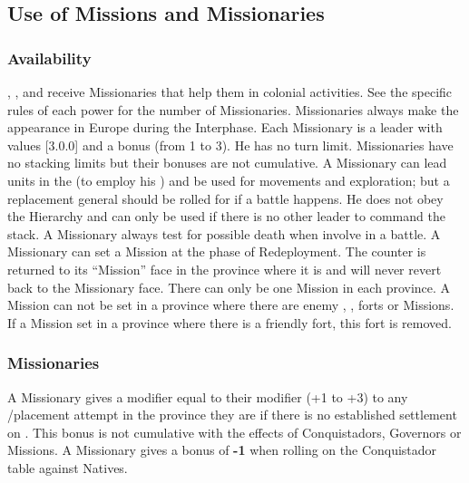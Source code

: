


\subsection{Use of Missions and Missionaries}


\subsubsection{Availability}
\aparag \SPA, \POR, \FRA and \ANG receive Missionaries that help them in
colonial activities. See the specific rules of each power for the number of
Missionaries.
\bparag Missionaries always make the appearance in Europe during the
Interphase.
\aparag Each Missionary is a leader with values [3.0.0] and a bonus (from 1 to
3). He has no turn limit. Missionaries have no stacking limits but their
bonuses are not cumulative.
\bparag A Missionary can lead units in the \ROTW (to employ his \Man) and be
used for movements and exploration; but a replacement general should be rolled
for if a battle happens. He does not obey the Hierarchy and can only be used
if there is no other leader to command the stack. A Missionary always test for
possible death when involve in a battle.
\aparag A Missionary can set a Mission at the phase of Redeployment. The
counter is returned to its ``Mission'' face in the province where it is and
will never revert back to the Missionary face.
\bparag There can only be one Mission in each province. A Mission can not be
set in a province where there are enemy \COL, \TP, forts or Missions. If a
Mission set in a province where there is a friendly fort, this fort is
removed.


\subsubsection{Missionaries}
\aparag A Missionary gives a modifier equal to their modifier (+1 to +3) to
any \TP/\COL placement attempt in the province they are if there is no
established settlement on \Faceplus.
\bparag This bonus is not cumulative with the effects of Conquistadors,
Governors or Missions.
\aparag A Missionary gives a bonus of {\bf -1} when rolling on the
Conquistador table against Natives.


